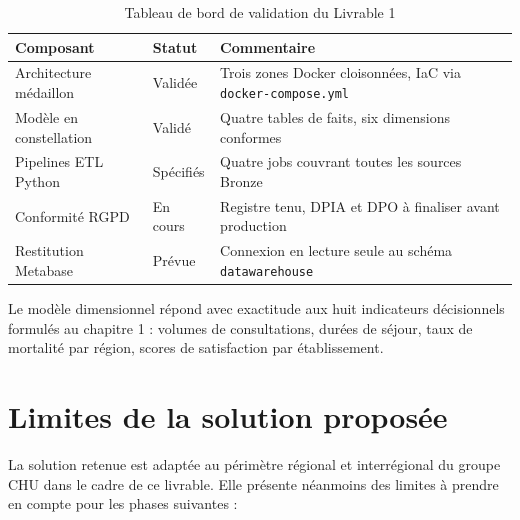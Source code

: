 \documentclass[12pt, a4paper]{report}
\begin{document}
\begin{itemize}[label=\textcolor{chuBlue}{\textbullet}]
\begin{table}[htbp]
\centering\footnotesize\renewcommand{\arraystretch}{1.5}
\begin{tabularx}{\linewidth}{@{} L{4.0cm} L{3.5cm} X @{}}
\toprule
{}
\textbf{Composant} & \textbf{Statut} & \textbf{Commentaire} \\
\midrule
Architecture médaillon & Validée & Trois zones Docker cloisonnées, IaC via \texttt{docker-compose.yml} \\
Modèle en constellation & Validé & Quatre tables de faits, six dimensions conformes \\
Pipelines ETL Python & Spécifiés & Quatre jobs couvrant toutes les sources Bronze \\
Conformité RGPD & En cours & Registre tenu, DPIA et DPO à finaliser avant production \\
Restitution Metabase & Prévue & Connexion en lecture seule au schéma \texttt{datawarehouse} \\
\bottomrule
\end{tabularx}
\caption{Tableau de bord de validation du Livrable 1}
\label{tab:bilan_l1}
\end{table}

Le modèle dimensionnel répond avec exactitude aux huit indicateurs décisionnels formulés au chapitre 1 : volumes de consultations, durées de séjour, taux de mortalité par région, scores de satisfaction par établissement.

\section{Limites de la solution proposée}

La solution retenue est adaptée au périmètre régional et interrégional du groupe CHU dans le cadre de ce livrable. Elle présente néanmoins des limites à prendre en compte pour les phases suivantes :


\end{itemize}
\end{document}

